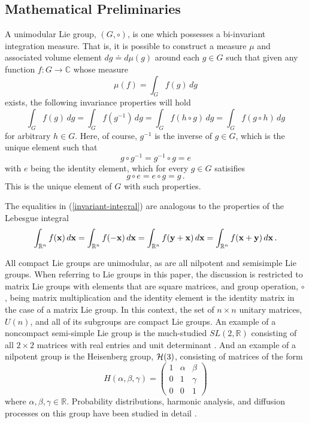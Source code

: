 \documentclass{svmult}
\newcommand{\IR}{\mathbb{R}}
\newcommand{\IC}{\mathbb{C}}
\newcommand{\xx}{{\bf x}}
\newcommand{\yy}{{\bf y}}
\begin{document}
\subsection{Mathematical Preliminaries}

A unimodular Lie group, $(G,\circ)$, is one which possesses a bi-invariant integration measure.
That is, it is possible to construct a measure $\mu$ and associated volume element $dg \doteq d\mu(g)$ around each $g \in G$ such that given any function $f:G\rightarrow \IC$ whose measure
$$\mu(f) = \int_{G} f(g) \,dg $$
exists, the
following invariance properties will hold
\begin{equation}
\int_{G} f(g) \,dg = \int_{G} f(g^{-1}) \,dg = \int_{G} f(h \circ g) \,dg = \int_{G} f(g \circ h) \,dg
\label{invariant-integral}
\end{equation}
for arbitrary $h \in G$. Here, of course, $g^{-1}$ is the inverse of $g \in G$, which is the unique element such that
$$ g \circ g^{-1} = g^{-1} \circ g = e $$
with $e$ being the identity element, which for every $g \in G$ satisifies
$$ g \circ e = e \circ g = g\,. $$
This is the unique element of $G$ with such properties.

The equalities in (\ref{invariant-integral}) are analogous to the properties of the Lebesgue integral
$$ \int_{\IR^n} f(\xx) \,d\xx = \int_{\IR^n} f(-\xx) \,d\xx = \int_{\IR^n} f(\yy + \xx) \,d\xx = \int_{\IR^n} f(\xx + \yy) \,d\xx\,. $$

All compact Lie groups are unimodular, as are all nilpotent and semisimple Lie groups. When referring to Lie groups in this paper, the discussion is restricted to matrix Lie groups with
elements that are square matrices, and group operation, $\circ$, being matrix multiplication and the identity element is the identity matrix in the case of a matrix Lie group.
In this context, the set of $n\times n$ unitary matrices, $U(n)$, and all of its subgroups are
compact Lie groups. An example of a noncompact semi-simple Lie group is the much-studied  $SL(2,\IR)$ consisting of all $2\times 2$ matrices with real entries and unit determinant \cite{lang,8howe,harish,lang2}. And an example of a nilpotent
group is the Heisenberg group, ${\cal H}(3)$, consisting of matrices of the form
$$ H(\alpha,\beta,\gamma) = \left(\begin{array}{ccc}
1 & \alpha & \beta \\
0 & 1 & \gamma \\
0 & 0 & 1 \end{array} \right) $$
where $\alpha,\beta,\gamma \in \IR$.
Probability distributions, harmonic analysis, and diffusion processes on this group have
been studied in detail \cite{8thangavelu,7neuen}.
\end{document}
